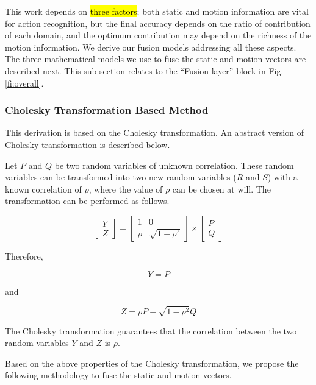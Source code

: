 
This work depends on \hl{three factors}; both static and motion information
are vital for action recognition, but the final accuracy depends on the ratio of contribution of each domain,
and the optimum contribution may depend on the richness of the motion information. We derive our fusion models addressing all these aspects.
The three mathematical models we use
to fuse the static and motion vectors are described next. This sub section relates to the ``Fusion layer'' block in Fig. \ref{fi:overall}.

\subsubsection{Cholesky Transformation Based Method}
\label{ss:cholesky}
This derivation is based on the Cholesky transformation. An
abstract version of Cholesky transformation is described below.

Let $P$ and $Q$ be two random variables of unknown correlation. These random variables can be
transformed into two new random variables ($R$ and $S$) with a known correlation of $\rho$, where the
value of $\rho$ can be chosen at will. The transformation can be performed as follows.

\begin{equation}
\begin{bmatrix}
    Y     \\
    Z
\end{bmatrix}
=
\begin{bmatrix}
    1  & 0 \\
    \rho  & \sqrt{1-\rho^2}
\end{bmatrix}
\times
\begin{bmatrix}
    P     \\
    Q
\end{bmatrix}
\end{equation}

Therefore,

\begin{equation}
Y = P
\end{equation}

and

\begin{equation}
Z = \rho P + \sqrt{1-\rho^2}Q
\end{equation}

The Cholesky transformation guarantees that the correlation between the two random variables
$Y$ and $Z$ is $\rho$.

Based on the above properties of the Cholesky transformation, we propose the following methodology to fuse the static and motion vectors.

